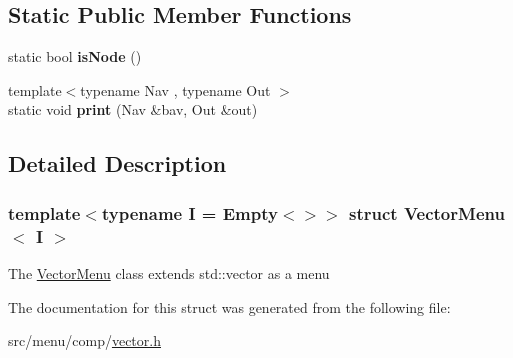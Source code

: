 \subsection*{Static Public Member Functions}
\begin{DoxyCompactItemize}
\item 
\mbox{\label{structVectorMenu_ab0f37c75d2be7a3c525d3c1000d893c6}} 
static bool {\bfseries is\+Node} ()
\item 
\mbox{\label{structVectorMenu_a6afd504bebb9fc0196133d541f2c0192}} 
{\footnotesize template$<$typename Nav , typename Out $>$ }\\static void {\bfseries print} (Nav \&bav, Out \&out)
\end{DoxyCompactItemize}


\subsection{Detailed Description}
\subsubsection*{template$<$typename I = Empty$<$$>$$>$\newline
struct Vector\+Menu$<$ I $>$}

The \hyperlink{structVectorMenu}{Vector\+Menu} class extends std\+::vector as a menu 

The documentation for this struct was generated from the following file\+:\begin{DoxyCompactItemize}
\item 
src/menu/comp/\hyperlink{vector_8h}{vector.\+h}\end{DoxyCompactItemize}
